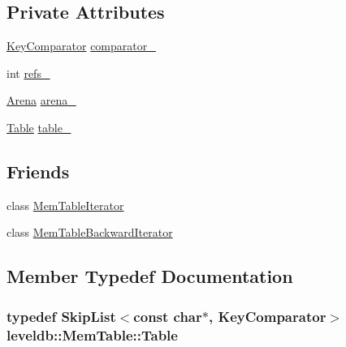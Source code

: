 \subsection*{Private Attributes}
\begin{DoxyCompactItemize}
\item 
\hyperlink{structleveldb_1_1_mem_table_1_1_key_comparator}{Key\+Comparator} \hyperlink{classleveldb_1_1_mem_table_ade7c99a1ef260f4d69c3109d87af6c36}{comparator\+\_\+}
\item 
int \hyperlink{classleveldb_1_1_mem_table_ac58a2b477ed0df577aa863e7e8619542}{refs\+\_\+}
\item 
\hyperlink{classleveldb_1_1_arena}{Arena} \hyperlink{classleveldb_1_1_mem_table_ad72f453899d3a7532ee9e8156b9c0610}{arena\+\_\+}
\item 
\hyperlink{classleveldb_1_1_mem_table_af42bc32bc4c20aea12fc647ee41df058}{Table} \hyperlink{classleveldb_1_1_mem_table_a9337befab75dc6796fe652a5714db255}{table\+\_\+}
\end{DoxyCompactItemize}
\subsection*{Friends}
\begin{DoxyCompactItemize}
\item 
class \hyperlink{classleveldb_1_1_mem_table_ad6cb602bccb9af617c8cb348ae693d4a}{Mem\+Table\+Iterator}
\item 
class \hyperlink{classleveldb_1_1_mem_table_ab6427243fb396d56604898725f9f2327}{Mem\+Table\+Backward\+Iterator}
\end{DoxyCompactItemize}


\subsection{Member Typedef Documentation}
\hypertarget{classleveldb_1_1_mem_table_af42bc32bc4c20aea12fc647ee41df058}{}
\subsubsection[{Table}]{\setlength{\rightskip}{0pt plus 5cm}typedef {\bf Skip\+List}$<$const char$\ast$, {\bf Key\+Comparator}$>$ {\bf leveldb\+::\+Mem\+Table\+::\+Table}\hspace{0.3cm}{\ttfamily [private]}}\label{classleveldb_1_1_mem_table_af42bc32bc4c20aea12fc647ee41df058}


